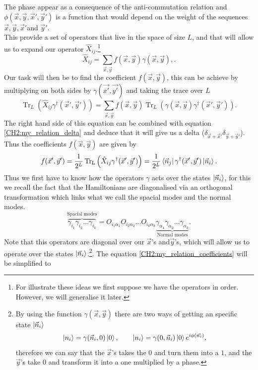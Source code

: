  The phase appear as a consequence of the anti-commutation relation and$\phi(\vec{x},\vec{y},\vec{x}',\vec{y}')$ is a function that would depend on the weight of the sequences $\vec{x},\vec{y},\vec{x}'$and $\vec{y}'$.\\
This provide a set of operators that live in the space of size $L$, and that will allow us to expand our operator $\hat{X}_{ij}$.\footnote{For illustrate these ideas we first suppose we have the operators in order. However, we will generalise it later.}
\begin{equation}
\hat{X}_{ij} = \sum_{\vec{x},\vec{y}} f(\vec{x},\vec{y})\gamma(\vec{x},\vec{y}),.
\end{equation}
Our task will then be to find the coefficient $f(\vec{x},\vec{y})$, this can be achieve by multiplying on both sides by $\gamma(\vec{x'},\vec{y'})$ and taking the trace over $L$
\begin{equation}
\operatorname{Tr}_L\left(\hat{X}_{ij}\gamma^{\dagger}(\vec{x}',\vec{y}')\right)=\sum_{\vec{x},\vec{y}}f(\vec{x},\vec{y}) \operatorname{Tr}_L\left(\gamma(\vec{x},\vec{y})\gamma^{\dagger}(\vec{x}',\vec{y}')\right).
\end{equation}
The right hand side of this equation can be combined with equation \eqref{CH2:my_relation_delta} and deduce that it will give us a delta ($\delta_{\vec{x}+\vec{x}'}\delta_{\vec{y}+\vec{y}'}$). Thus the coefficients $f(\vec{x},\vec{y})$ are given by
\begin{equation}
f(\vec{x}',\vec{y}') = \frac{1}{2^L}\operatorname{Tr_L}\left(\hat{X}_{ij}\gamma^{\dagger}(\vec{x}',\vec{y}')\right)=\frac{1}{2^L} \mathinner{\langle{\vec{n}_j}|}\gamma^{\dagger}(\vec{x}',\vec{y}')\mathinner{|{\vec{n}_i}\rangle}.
\label{CH2:my_relation_coefficients}
\end{equation}
Thus we first have to know how the operators $\gamma$ acts over the states $\mathinner{|{\vec{n}_i}\rangle}$, for this we recall the fact that the Hamiltonians are diagonalised via an orthogonal transformation which links what we call the spacial modes and the normal modes.
\begin{equation}
\overbrace{\gamma_{i_1}\gamma_{i_2}\ldots\gamma_{i_k}}^{\text{Spacial modes}}= O_{i_1\alpha_1}O_{i_2\alpha_2}\ldots O_{i_k\alpha_k} \underbrace{\gamma_{\alpha_1}\gamma_{\alpha_2}\ldots\gamma_{\alpha_k}}_{\text{Normal modes}}.
\end{equation}
Note that this operators are diagonal over our $\vec{x}$'s and$\vec{y}$'s, which will allow us to operate over the states $\mathinner{|{\vec{n}_i}\rangle}$.\footnote{By using the function $\gamma(\vec{x},\vec{y})$ there are two ways of getting an specific state $\mathinner{|{\vec{n}_i}\rangle}$
\begin{equation}
\mathinner{|{n_i}\rangle}=\gamma(\vec{n}_i,0)\mathinner{|{0}\rangle}, \qquad \mathinner{|{n_i}\rangle}=\gamma(0,\vec{n}_i)\mathinner{|{0}\rangle}e^{i\phi(\vec{n_i})},
\end{equation}
therefore we can say that the $\vec{x}$'s takes the $0$ and turn them into a $1$, and the $\vec{y}$'s take $0$ and transform it into a one multiplied by a phase.
}. The equation \eqref{CH2:my_relation_coefficients} will be simplified to
